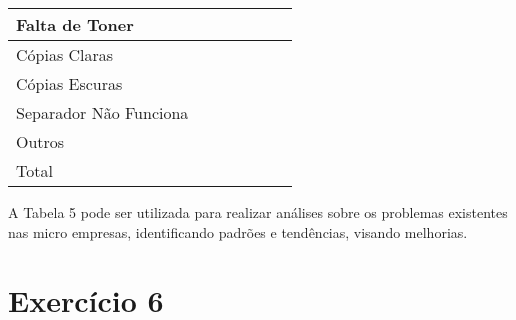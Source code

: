 \documentclass{article}
\begin{document}
\begin{table}[h!]
\begin{tabular}{|lllllll|}
\multicolumn{1}{|l|}{Falta de Toner}            & \multicolumn{1}{c|}{}    & \multicolumn{1}{l|}{}    & \multicolumn{1}{l|}{}    & \multicolumn{1}{l|}{}    & \multicolumn{1}{l|}{}    &                                             \\ \hline
\multicolumn{1}{|l|}{Cópias Claras}             & \multicolumn{1}{c|}{}    & \multicolumn{1}{c|}{}    & \multicolumn{1}{l|}{}    & \multicolumn{1}{l|}{}    & \multicolumn{1}{l|}{}    &                                             \\ \hline
\multicolumn{1}{|l|}{Cópias Escuras}            & \multicolumn{1}{l|}{}    & \multicolumn{1}{l|}{}    & \multicolumn{1}{l|}{}    & \multicolumn{1}{l|}{}    & \multicolumn{1}{l|}{}    &                                             \\ \hline
\multicolumn{1}{|l|}{Separador Não Funciona}    & \multicolumn{1}{l|}{}    & \multicolumn{1}{l|}{}    & \multicolumn{1}{l|}{}    & \multicolumn{1}{l|}{}    & \multicolumn{1}{l|}{}    &                                             \\ \hline
\multicolumn{1}{|l|}{Outros}                    & \multicolumn{1}{l|}{}    & \multicolumn{1}{l|}{}    & \multicolumn{1}{l|}{}    & \multicolumn{1}{l|}{}    & \multicolumn{1}{l|}{}    &                                             \\ \hline
\multicolumn{1}{|l|}{Total}                     & \multicolumn{1}{l|}{}    & \multicolumn{1}{l|}{}    & \multicolumn{1}{l|}{}    & \multicolumn{1}{l|}{}    & \multicolumn{1}{l|}{}    &                                             \\ \hline
\end{tabular}
\end{table}

A Tabela 5 pode ser utilizada para realizar análises sobre os problemas existentes nas micro empresas, identificando padrões e tendências, visando melhorias.


\section*{Exercício 6}
\end{document}
